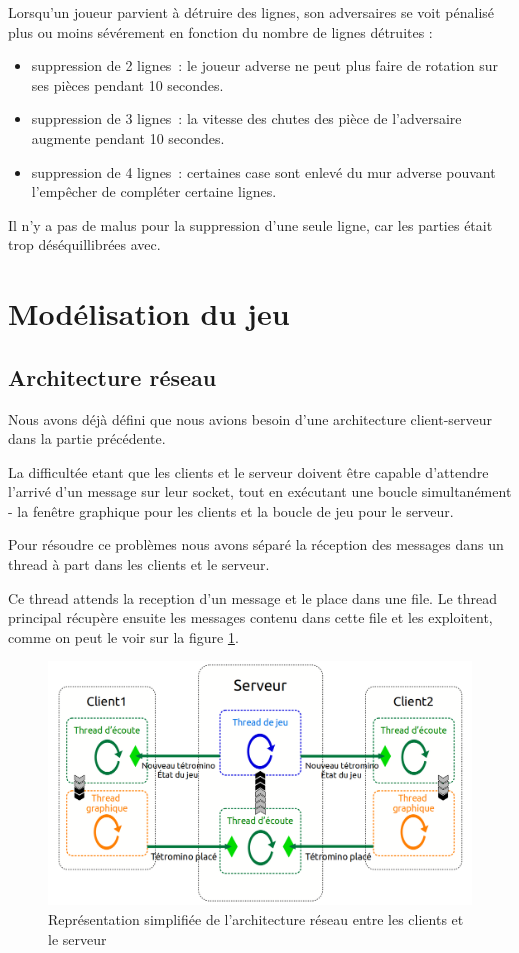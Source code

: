 \documentclass[a4paper, 12pt]{article}
\begin{document}
			Lorsqu'un joueur parvient à détruire des lignes, son adversaires se voit pénalisé plus ou moins sévérement en fonction du nombre de lignes détruites :
			\begin{itemize}
				\item suppression de 2 lignes : le joueur adverse ne peut plus faire de rotation sur ses pièces pendant 10 secondes.
				\item suppression de 3 lignes : la vitesse des chutes des pièce de l’adversaire augmente pendant 10 secondes.
				\item suppression de 4 lignes : certaines case sont enlevé du mur adverse pouvant l’empêcher de compléter certaine lignes.
			\end{itemize}

			Il n'y a pas de malus pour la suppression d'une seule ligne, car les parties était trop déséquillibrées avec.

	\section{Modélisation du jeu}

		\subsection{Architecture réseau}

			Nous avons déjà défini que nous avions besoin d'une architecture client-serveur dans la partie précédente.

			La difficultée etant que les clients et le serveur doivent être capable d'attendre l'arrivé d'un message sur leur socket, tout en exécutant une boucle simultanément - la fenêtre graphique pour les clients et la boucle de jeu pour le serveur.


			Pour résoudre ce problèmes nous avons séparé la réception des messages dans un thread à part dans les clients et le serveur.

			Ce thread attends la reception d'un message et le place dans une file. Le thread principal récupère ensuite les messages contenu dans cette file et les exploitent, comme on peut le voir sur la figure \ref{fig:rezo}.

			\begin{figure}[bt]
				\centering
				\includegraphics[scale=0.35]{img/archi_reseau.png}
				\caption{Représentation simplifiée de l'architecture réseau entre les clients et le serveur}
				\label{fig:rezo}
			\end{figure}
\end{document}
